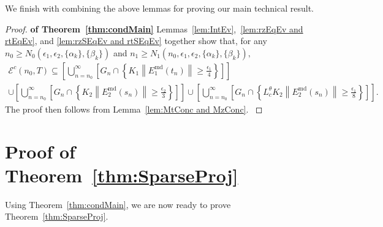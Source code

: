 \documentclass[usenames,dvipsnames,final,12pt]{colt2018} %
\newcommand{\et}{\epsilon_1}
\newcommand{\Et}{E_1}
\newcommand{\Kt}{K_1}
\newcommand{\EtM}{\Et^{\md}}
\newcommand{\Lt}[1]{L^{\theta}_{#1}}
\newcommand{\ez}{\epsilon_2}
\newcommand{\Ez}{E_2}
\newcommand{\Kz}{K_2}
\newcommand{\EzM}{\Ez^{\md}}
\newcommand{\aftE}{\text{after}}
\newcommand{\midE}{\text{mid}}
\newcommand{\md}{\text{md}}
\newcommand{\tI}[1]{t_{#1}}
\newcommand{\sI}[1]{s_{#1}}
\newcommand{\cE}{\mathcal{E}}
\newcommand{\norm}[1]{\left\lVert#1\right\rVert}
\newcommand{\gal}[1]{#1}
\begin{document}
We finish with combining the above lemmas for proving our main technical result.

\begin{proof}\textbf{of Theorem~\ref{thm:condMain}}
{
%
Lemmas~\ref{lem:IntEv},~\ref{lem:rzEqEv and rtEqEv}, and \ref{lem:rzSEqEv and rtSEqEv} together show that, for \gal{any $n_0 \geq N_0(\et,\ez,\{\alpha_k\},\{\beta_k\})$ and $n_1 \geq N_1(n_0,\et,\ez,\{\alpha_k\},\{\beta_k\}),$}
\begin{multline*}
\cE^c(n_0,T) \subseteq
\left[\bigcup_{n = n_0}^{\infty} \left[G_n \cap \left\{ \Kt \norm{\EtM(\tI{n})} \geq \frac{\et}{4}\right\}\right]\right]\\
\cup \left[\bigcup_{n = n_0}^{\infty} \left[G_n \cap \left\{ \Kz \norm{\EzM(\sI{n})} \geq \frac{\ez}{3}\right\}\right]\right] \cup \left[\bigcup_{n = n_0}^{\infty} \left[G_n \cap \left\{ \Lt{c} \Kz \norm{\EzM(\sI{n})} \geq \frac{\et}{8}\right\}\right]\right].
\end{multline*}
%
The proof then follows from
Lemma~\ref{lem:MtConc and MzConc}.
}
\end{proof}






\section{\gal{Proof of Theorem~\ref{thm:SparseProj}}}
%
\label{sec:Proof_Sparse_Proj}
\gal{Using Theorem~\ref{thm:condMain}, we are now ready to prove Theorem~\ref{thm:SparseProj}.}
\end{document}
